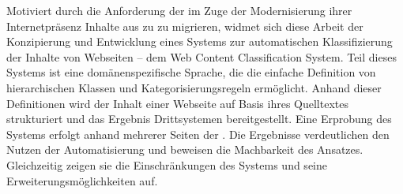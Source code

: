 Motiviert durch die Anforderung der {\fernUni} im Zuge der Modernisierung ihrer
Internetpräsenz Inhalte aus {\wordpress} zu {\imperia} zu migrieren,
widmet sich diese Arbeit der Konzipierung und Entwicklung eines Systems
zur automatischen Klassifizierung der Inhalte von Webseiten
-- dem Web Content Classification System.
Teil dieses Systems ist eine domänenspezifische Sprache, die die einfache
Definition von hierarchischen Klassen und Kategorisierungsregeln ermöglicht.
Anhand dieser Definitionen wird der Inhalt einer Webseite auf Basis ihres
Quelltextes strukturiert und das Ergebnis Drittsystemen bereitgestellt.
Eine Erprobung des Systems erfolgt anhand mehrerer Seiten der {\fernUni}.
Die Ergebnisse verdeutlichen den Nutzen der Automatisierung und
beweisen die Machbarkeit des Ansatzes.
Gleichzeitig zeigen sie die Einschränkungen des Systems und seine Erweiterungsmöglichkeiten auf.